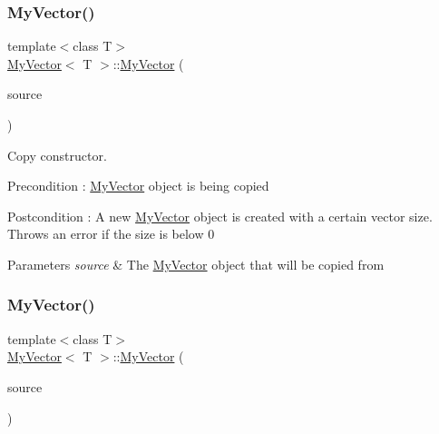 \subsubsection{\texorpdfstring{MyVector()}{MyVector()}\hspace{0.1cm}{\footnotesize\ttfamily [3/4]}}
{\footnotesize\ttfamily template$<$class T$>$ \\
\mbox{\hyperlink{class_my_vector}{My\+Vector}}$<$ T $>$\+::\mbox{\hyperlink{class_my_vector}{My\+Vector}} (\begin{DoxyParamCaption}\item[{const \mbox{\hyperlink{class_my_vector}{My\+Vector}}$<$ T $>$ \&}]{source }\end{DoxyParamCaption})}



Copy constructor. 

\begin{DoxyPrecond}{Precondition}
\+: \mbox{\hyperlink{class_my_vector}{My\+Vector}} object is being copied 
\end{DoxyPrecond}
\begin{DoxyPostcond}{Postcondition}
\+: A new \mbox{\hyperlink{class_my_vector}{My\+Vector}} object is created with a certain vector size. Throws an error if the size is below 0 
\end{DoxyPostcond}

\begin{DoxyParams}{Parameters}
{\em source} & The \mbox{\hyperlink{class_my_vector}{My\+Vector}} object that will be copied from \\
\hline
\end{DoxyParams}
\mbox{\label{class_my_vector_a7b2d4483f19b1ea3525e49336c857111}} 
\subsubsection{\texorpdfstring{MyVector()}{MyVector()}\hspace{0.1cm}{\footnotesize\ttfamily [4/4]}}
{\footnotesize\ttfamily template$<$class T$>$ \\
\mbox{\hyperlink{class_my_vector}{My\+Vector}}$<$ T $>$\+::\mbox{\hyperlink{class_my_vector}{My\+Vector}} (\begin{DoxyParamCaption}\item[{\mbox{\hyperlink{class_my_vector}{My\+Vector}}$<$ T $>$ \&\&}]{source }\end{DoxyParamCaption})}



